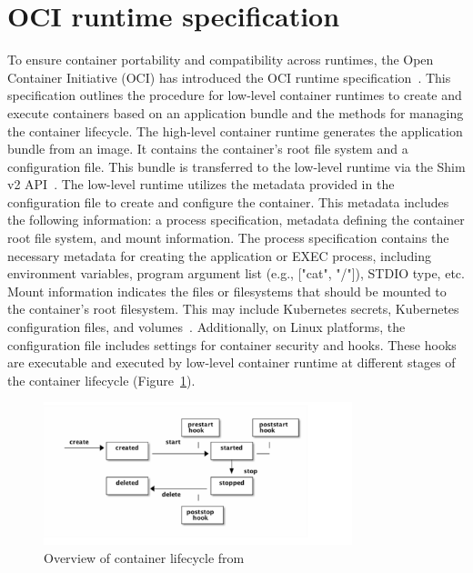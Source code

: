 \section{OCI runtime specification}
\label{sec:back_oci_runtime_spec}
To ensure container portability and compatibility across runtimes, the Open Container Initiative (OCI) has introduced the OCI runtime specification~\cite*{oci-runtime-spec}. This specification outlines the procedure for low-level container runtimes to create and execute containers based on an 
application bundle and the methods for managing the container lifecycle. The high-level container runtime generates the application bundle from an image. It contains the container's root file system and a configuration file. This bundle is transferred to the low-level runtime via the Shim v2 API~\cite*{shim_v2}. 
The low-level runtime utilizes the metadata provided in the configuration file to create and configure the container. This metadata includes the following information: a process specification, metadata defining the container root file system, and mount information. The process specification contains 
the necessary metadata for creating the application or EXEC process, including environment variables, program argument list (e.g., ["cat", "/"]), STDIO type, etc. Mount information indicates the files or filesystems that should be mounted to the container's root filesystem. This may include 
Kubernetes secrets, Kubernetes configuration files, and volumes~\cite*{k8s}. Additionally, on Linux platforms, the configuration file includes settings for container security and hooks. These hooks are executable and executed by low-level container runtime at 
different stages of the container lifecycle (Figure~\ref{fig:Container_Lifecycle_state}).
\begin{figure}[htp]
  \centering
  \includegraphics[width=0.8\textwidth]{images/Container_Lifecycle_state.PNG}
  \caption[Overview of container lifecycle]{Overview of container lifecycle from \cite*{oci_Lifecycle}}
  \label{fig:Container_Lifecycle_state}
\end{figure}

